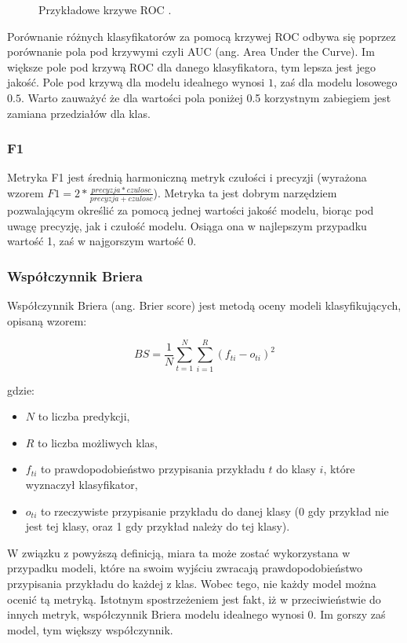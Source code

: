 \documentclass[a4paper, twoside, 11pt, openright]{article}
\begin{document}
\begin{figure}[H]
\caption{Przykładowe krzywe ROC \cite{roccurves}.}%
\label{img:roc}
\end{figure}


Porównanie różnych klasyfikatorów za pomocą krzywej ROC odbywa się poprzez porównanie pola pod krzywymi czyli AUC (ang. Area Under the Curve). Im większe pole pod krzywą ROC dla danego klasyfikatora, tym lepsza jest jego jakość. Pole pod krzywą dla modelu idealnego wynosi $1$, zaś dla modelu losowego $0.5$. Warto zauważyć że dla wartości pola poniżej 0.5  korzystnym zabiegiem jest zamiana przedziałów dla klas.

\subsubsection{F1}

Metryka F1 jest średnią harmoniczną metryk czułości i precyzji (wyrażona wzorem $F1=2*\frac{precyzja*czulosc}{precyzja+czulosc}$). Metryka ta jest dobrym narzędziem pozwalającym określić za pomocą jednej wartości jakość modelu, biorąc pod uwagę precyzję, jak i czułość modelu. Osiąga ona w najlepszym przypadku wartość 1, zaś w najgorszym wartość 0. 

\subsubsection{Współczynnik Briera}

Współczynnik Briera (ang. Brier score)\cite{brier} jest metodą oceny modeli klasyfikujących, opisaną wzorem:

\begin{equation}
BS=\frac{1}{N} \sum_{t=1}^{N} \sum_{i=1}^{R}(f_{ti}-o_{ti})^2
\end{equation}

gdzie:
\begin{itemize}
\item $N$ to liczba predykcji,
\item $R$  to liczba możliwych klas,
\item $f_{ti}$ to prawdopodobieństwo przypisania przykładu $t$ do klasy $i$, które wyznaczył klasyfikator,
\item $o_{ti}$ to rzeczywiste przypisanie przykładu do danej klasy (0 gdy przykład nie jest tej klasy, oraz 1 gdy przykład należy do tej klasy).
\end{itemize}

W związku z powyższą definicją, miara ta może zostać wykorzystana w przypadku modeli, które na swoim wyjściu zwracają prawdopodobieństwo przypisania przykładu do każdej z klas. Wobec tego, nie każdy model można ocenić tą metryką. Istotnym spostrzeżeniem jest fakt, iż w przeciwieństwie do innych metryk, współczynnik Briera modelu idealnego wynosi $0$. Im gorszy zaś model, tym większy współczynnik.
\end{document}
